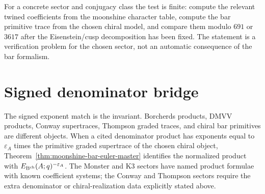 \begin{remark}
\label{rem:moonshine-falsification-test}
For a concrete sector and conjugacy class the test is finite:
compute the relevant twined coefficients from the moonshine character
table, compute the bar primitive trace from the chosen chiral model,
and compare them modulo $691$ or $3617$ after the Eisenstein/cusp
decomposition has been fixed.  The statement is a verification
problem for the chosen sector, not an automatic consequence of the
bar formalism.
\end{remark}

\section*{Signed denominator bridge}

\noindent
The signed exponent match is the invariant.  Borcherds
products, DMVV products, Conway supertraces, Thompson graded traces,
and chiral bar primitives are different objects.  When a cited
denominator product has exponents equal to
$\varepsilon_A$ times the primitive graded supertrace of the chosen
chiral object, Theorem~\ref{thm:moonshine-bar-euler-master} identifies
the normalized product with
$E_{\mathrm B^{\mathrm{ch}}}(A;q)^{-\varepsilon_A}$.  The Monster and K3 sectors have
named product formulae with known coefficient systems; the Conway and
Thompson sectors require the extra denominator or chiral-realization
data explicitly stated above.

